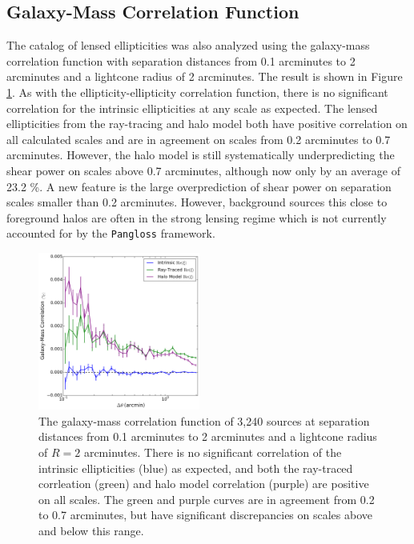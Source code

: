 \documentclass[%
 reprint,
 amsmath,amssymb,
 aps,nofootinbib
]{revtex4-1}
\begin{document}
\subsection*{Galaxy-Mass Correlation Function}

The catalog of lensed ellipticities was also analyzed using the galaxy-mass correlation function with separation distances from 0.1 arcminutes to 2 arcminutes and a lightcone radius of 2 arcminutes. The result is shown in Figure \ref{ng_corr}. As with the ellipticity-ellipticity correlation function, there is no significant correlation for the intrinsic ellipticities at any scale as expected. The lensed ellipticities from the ray-tracing and halo model both have positive correlation on all calculated scales and are in agreement on scales from 0.2 arcminutes to 0.7 arcminutes. However, the halo model is still systematically underpredicting the shear power on scales above 0.7 arcminutes, although now only by an average of 23.2 \%. A new feature is the large overprediction of shear power on separation scales smaller than 0.2 arcminutes. However, background sources this close to foreground halos are often in the strong lensing regime which is not currently accounted for by the \texttt{Pangloss} framework.

\begin{figure}
    \centering
    \includegraphics[width=0.475\textwidth]{figs-swe/ng_corr.png}
    \captionsetup{justification=raggedright,singlelinecheck=false}
    \caption{The galaxy-mass correlation function of 3,240 sources at separation distances from 0.1 arcminutes to 2 arcminutes and a lightcone radius of $R=2$ arcminutes. There is no significant correlation of the intrinsic ellipticities (blue) as expected, and both the ray-traced corrleation (green) and halo model correlation (purple) are positive on all scales. The green and purple curves are in agreement from 0.2 to 0.7 arcminutes, but have significant discrepancies on scales above and below this range.}
    \label{ng_corr}
\end{figure}
\end{document}
